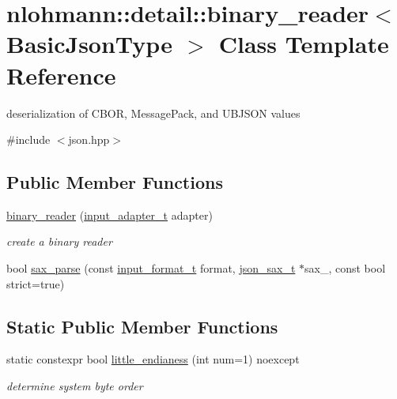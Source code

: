\hypertarget{classnlohmann_1_1detail_1_1binary__reader}{}\section{nlohmann\+:\+:detail\+:\+:binary\+\_\+reader$<$ Basic\+Json\+Type $>$ Class Template Reference}
\label{classnlohmann_1_1detail_1_1binary__reader}


deserialization of C\+B\+OR, Message\+Pack, and U\+B\+J\+S\+ON values  




{\ttfamily \#include $<$json.\+hpp$>$}

\subsection*{Public Member Functions}
\begin{DoxyCompactItemize}
\item 
\mbox{\hyperlink{classnlohmann_1_1detail_1_1binary__reader_a7e643baadaf4c31718cd74833bdd542f}{binary\+\_\+reader}} (\mbox{\hyperlink{namespacenlohmann_1_1detail_ae132f8cd5bb24c5e9b40ad0eafedf1c2}{input\+\_\+adapter\+\_\+t}} adapter)
\begin{DoxyCompactList}\small\item\em create a binary reader \end{DoxyCompactList}\item 
bool \mbox{\hyperlink{classnlohmann_1_1detail_1_1binary__reader_a68ef932b48547bc4e6ce1df2856f6b8f}{sax\+\_\+parse}} (const \mbox{\hyperlink{namespacenlohmann_1_1detail_aa554fc6a11519e4f347deb25a9f0db40}{input\+\_\+format\+\_\+t}} format, \mbox{\hyperlink{structnlohmann_1_1json__sax}{json\+\_\+sax\+\_\+t}} $\ast$sax\+\_\+, const bool strict=true)
\end{DoxyCompactItemize}
\subsection*{Static Public Member Functions}
\begin{DoxyCompactItemize}
\item 
static constexpr bool \mbox{\hyperlink{classnlohmann_1_1detail_1_1binary__reader_a1d8f70f95d241354f86a0b9ae711c1c3}{little\+\_\+endianess}} (int num=1) noexcept
\begin{DoxyCompactList}\small\item\em determine system byte order \end{DoxyCompactList}\end{DoxyCompactItemize}


